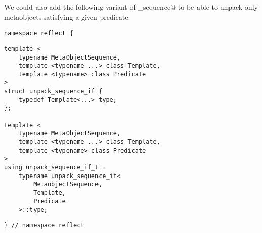 We could also add the following variant of \verb@unpack_sequence@ to be
able to unpack only metaobjects satisfying a given predicate:

\begin{verbatim}
namespace reflect {
\end{verbatim}
\begin{verbatim}
template <
	typename MetaObjectSequence,
	template <typename ...> class Template,
	template <typename> class Predicate
>
struct unpack_sequence_if {
	typedef Template<...> type;
};

template <
	typename MetaObjectSequence,
	template <typename ...> class Template,
	template <typename> class Predicate
>
using unpack_sequence_if_t =
	typename unpack_sequence_if<
		MetaobjectSequence,
		Template,
		Predicate
	>::type;
\end{verbatim}
\begin{verbatim}
} // namespace reflect
\end{verbatim}

